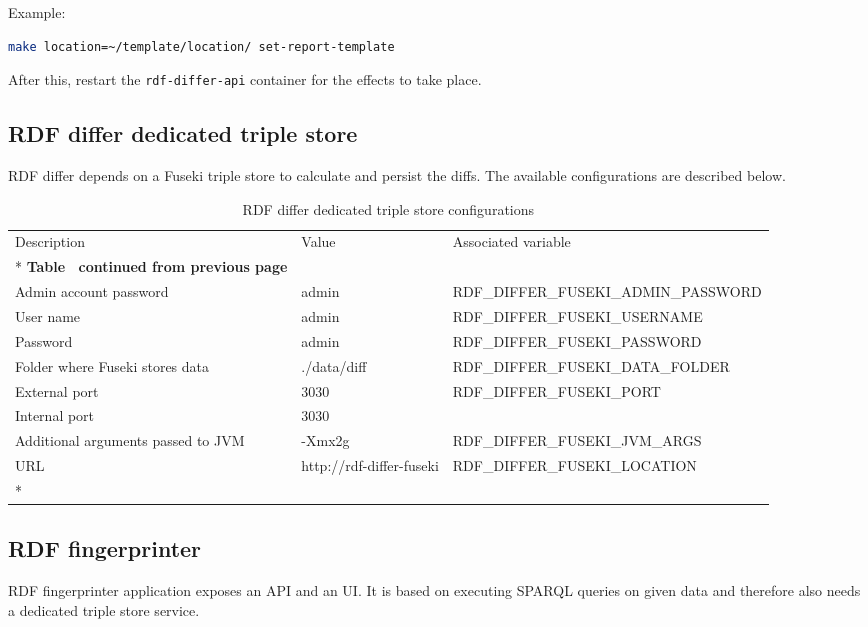 		Example:
		\begin{lstlisting}[language=bash]
make location=~/template/location/ set-report-template
		\end{lstlisting}

		After this, restart the \texttt{rdf-differ-api} container for the effects to take place.

	
	\subsection{RDF differ dedicated triple store}
	
	RDF differ depends on a Fuseki triple store to calculate and persist the diffs. The available configurations are described below. 

	\begin{longtable}[c]{@{}p{4cm}p{2cm}l@{}}
		\toprule
		Description & Value & Associated variable \\* \midrule
		\endfirsthead
		\multicolumn{3}{c}%
		{{\bfseries Table \thetable\ continued from previous page}} \\
		\endhead
		\bottomrule
		\endfoot
		\endlastfoot
		Admin account password & admin & RDF\_DIFFER\_FUSEKI\_ADMIN\_PASSWORD \\
		User name & admin & RDF\_DIFFER\_FUSEKI\_USERNAME \\
		Password & admin & RDF\_DIFFER\_FUSEKI\_PASSWORD \\
		Folder where Fuseki stores data & ./data/diff & RDF\_DIFFER\_FUSEKI\_DATA\_FOLDER \\
		External port & 3030 & RDF\_DIFFER\_FUSEKI\_PORT \\
		Internal port & 3030 &  \\
		Additional arguments passed to JVM & -Xmx2g & RDF\_DIFFER\_FUSEKI\_JVM\_ARGS \\
		URL & http://rdf-differ-fuseki & RDF\_DIFFER\_FUSEKI\_LOCATION \\* \bottomrule
		\caption{RDF differ dedicated triple store configurations}
		\label{tab:my-table2}\\
	\end{longtable}
	
	\subsection{RDF fingerprinter}
	
	RDF fingerprinter application exposes an API and an UI. It is based on executing SPARQL queries on given data and therefore also needs a dedicated triple store service. 

